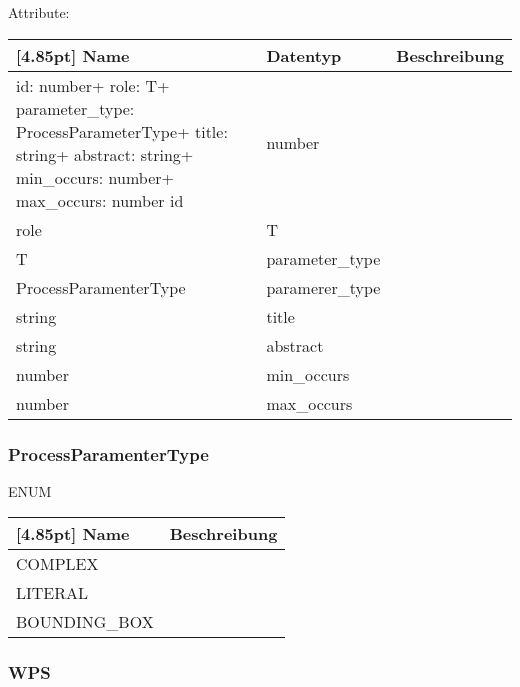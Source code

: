     		Attribute:
            \begin{center}
            	\renewcommand{\arraystretch}{1.5}
                \setlength\tabcolsep{5pt}
            	\begin{tabularx}{\textwidth}{|l|l|X|}
            		\hline
                    \rowcolor[gray]{0.75}[4.85pt]            		
                    Name & Datentyp & Beschreibung \\ \hline
                    id: number+ role: T+ parameter_type: ProcessParameterType+ title: string+ abstract: string+ min_occurs: number+ max_occurs: number
            		id & number &  \\ \hline
            		role & T & \\ \hline
            		T & parameter_type &  \\ \hline
            		ProcessParamenterType & paramerer_type &  \\ \hline
            		string & title &  \\ \hline
            		string & abstract &  \\ \hline
            		number & min_occurs &  \\ \hline
            		number & max_occurs &  \\ \hline
            	\end{tabularx}
            \end{center}
                
    		\subsubsection{ProcessParamenterType}
    		
    		ENUM
            \begin{center}
            	\renewcommand{\arraystretch}{1.5}
	            \setlength\tabcolsep{5pt}
            	\begin{tabularx}{\textwidth}{|l|X|}
            		\hline
                    \rowcolor[gray]{0.75}[4.85pt]
            	    Name & Beschreibung \\ \hline
            		COMPLEX &   \\ \hline
            		LITERAL &   \\ \hline
            		BOUNDING_BOX  &  \\ \hline
            	\end{tabularx}
            \end{center}
                
    		\subsubsection{WPS}
    		
